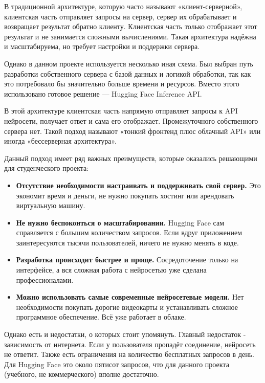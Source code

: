 \documentclass[14pt, a4paper]{extarticle}
\begin{document}
\begin{enumerate}
\noindent В традиционной архитектуре, которую часто называют «клиент-серверной», клиентская часть отправляет запросы на сервер, сервер их обрабатывает и возвращает результат обратно клиенту. Клиентская часть только отображает этот результат и не занимается сложными вычислениями. Такая архитектура надёжна и масштабируема, но требует настройки и поддержки сервера.

\medskip
\noindent Однако в данном проекте используется несколько иная схема. Был выбран путь разработки собственного сервера с базой данных и логикой обработки, так как это потребовало бы значительно больше времени и ресурсов. Вместо этого использовано готовое решение — Hugging Face Inference API.

\medskip
\noindent В этой архитектуре клиентская часть напрямую отправляет запросы к API нейросети, получает ответ и сама его отображает. Промежуточного собственного сервера нет. Такой подход называют «тонкий фронтенд плюс облачный API» или иногда «бессерверная архитектура».

\medskip
\noindent Данный подход имеет ряд важных преимуществ, которые оказались решающими для студенческого проекта:

\begin{itemize}
\item \textbf{Отсутствие необходимости настраивать и поддерживать свой сервер.} Это экономит время и деньги, не нужно покупать хостинг или арендовать виртуальную машину.

\item \textbf{Не нужно беспокоиться о масштабировании.} Hugging Face сам справляется с большим количеством запросов. Если вдруг приложением заинтересуются тысячи пользователей, ничего не нужно менять в коде.

\item \textbf{Разработка происходит быстрее и проще.} Сосредоточение только на интерфейсе, а вся сложная работа с нейросетью уже сделана профессионалами.

\item \textbf{Можно использовать самые современные нейросетевые модели.} Нет необходимости покупать дорогие видеокарты и устанавливать сложное программное обеспечение. Всё уже работает в облаке.
\end{itemize}

\noindent Однако есть и недостатки, о которых стоит упомянуть. Главный недостаток - зависимость от интернета. Если у пользователя пропадёт соединение, нейросеть не ответит. Также есть ограничения на количество бесплатных запросов в день. Для Hugging Face это около пятисот запросов, что для данного проекта (учебного, не коммерческого) вполне достаточно.


\end{enumerate}
\end{document}
